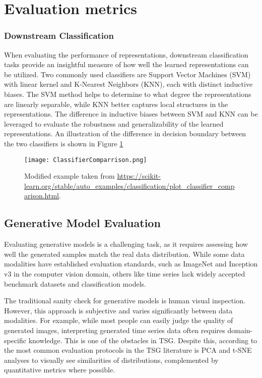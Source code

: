 \documentclass[../../thesis.tex]{subfiles}
\begin{document}
\section{Evaluation metrics}

\subsubsection{Downstream Classification}

When evaluating the performance of representations, downstream classification tasks provide an insightful measure of how well the learned representations can be utilized. Two commonly used classifiers are Support Vector Machines (SVM) with linear kernel and K-Nearest Neighbors (KNN), each with distinct inductive biases. The SVM method helps to determine to what degree the representations are linearly separable, while KNN better captures local structures in the representations. The difference in inductive biases between SVM and KNN can be leveraged to evaluate the robustness and generalizability of the learned representations. An illustration of the difference in decision boundary between the two classifiers is shown in Figure \ref{fig:ClassifierComparrison}

\begin{figure}[h]
    \texttt{[image: ClassifierComparrison.png]}
    \centering
    \caption{Modified example taken from \url{https://scikit-learn.org/stable/auto_examples/classification/plot_classifier_comparison.html}.}
    \label{fig:ClassifierComparrison}
\end{figure}

\subsection{Generative Model Evaluation}

Evaluating generative models is a challenging task, as it requires assessing how well the generated samples match the real data distribution. While some data modalities have established evaluation standards, such as ImageNet and Inception v3 in the computer vision domain, others like time series lack widely accepted benchmark datasets and classification models.\newline

The traditional sanity check for generative models is human visual inspection. However, this approach is subjective and varies significantly between data modalities. For example, while most people can easily judge the quality of generated images, interpreting generated time series data often requires domain-specific knowledge. This is one of the obstacles in TSG. Despite this, according to \cite{TimeVQVAE} the most common evaluation protocols in the TSG literature is PCA and t-SNE analyses to visually see similarities of distributions, complemented by quantitative metrics where possible.\newline
\end{document}
